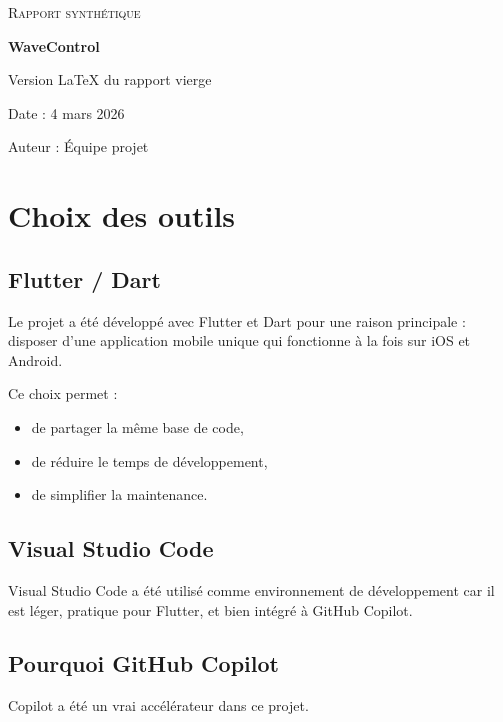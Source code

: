 \documentclass[12pt,a4paper]{report}
\begin{document}
\begin{titlepage}
    \centering
    {\scshape\LARGE Rapport synthétique\par}
    \vspace{1cm}
    {\Huge\bfseries WaveControl\par}
    \vspace{0.5cm}
    {\Large Version LaTeX du rapport vierge\par}
    \vspace{1.5cm}

    {\large Date : 4 mars 2026\par}
    \vspace{0.2cm}
    {\large Auteur : Équipe projet\par}

    \vfill
\end{titlepage}

\tableofcontents
\clearpage

\chapter{Choix des outils}

\section{Flutter / Dart}
Le projet a été développé avec Flutter et Dart pour une raison principale : disposer d’une application mobile unique qui fonctionne à la fois sur iOS et Android.

Ce choix permet :
\begin{itemize}[leftmargin=*]
  \item de partager la même base de code,
  \item de réduire le temps de développement,
  \item de simplifier la maintenance.
\end{itemize}

\section{Visual Studio Code}
Visual Studio Code a été utilisé comme environnement de développement car il est léger, pratique pour Flutter, et bien intégré à GitHub Copilot.

\section{Pourquoi GitHub Copilot}
Copilot a été un vrai accélérateur dans ce projet.
\end{document}
